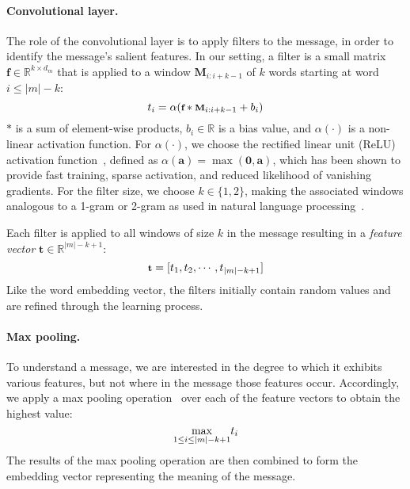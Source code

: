 \documentclass{article}
\begin{document}
\paragraph*{Convolutional layer.} The role of the convolutional layer is to
apply filters to the message, in order to identify the message's salient
features.  In our setting, a filter is a small matrix $\textbf{f} \in
\mathbb{R}^{k \times d_m}$ that is applied to a window
$\textbf{M}_{i:i+k-1}$ of $k$ words starting at word $i \leq |m|-k$:
\begin{equation} \footnotesize
\label{eq:filtering}
t_i = \alpha ( \textbf{f} \ast \textbf{M}_{i:i+k-1} + b_i) 
\end{equation}
$\ast$ is a sum of element-wise products, $b_i \in \mathbb{R}$ is a bias
value, and $\alpha(\cdot)$ is a non-linear activation function.  For
$\alpha(\cdot)$, we choose the rectified linear unit (ReLU) activation
function~\cite{nair2010rectified,dahl2013improving}, defined as
$\alpha(\mathbf{a}) = \max(\mathbf{0}, \mathbf{a})$, which has been shown
to provide fast training, sparse activation, and reduced likelihood of
vanishing gradients.  For the filter size, we choose $k \in \{1,2\}$,
making the associated windows analogous to a 1-gram or 2-gram as used in
natural language processing~\cite{brown1992class}.

Each filter is applied to all windows of size $k$ in the message resulting
in a {\em feature vector} $\textbf{t} \in \mathbb{R}^{|m|-k+1}$:
\begin{equation} \footnotesize
\label{eq:ftr_vector}
\textbf{t} = [t_1, t_2, \cdots, t_{|m|-k+1}]
\end{equation}
Like the word embedding vector, the filters initially contain random values
and are refined through the learning process.

\paragraph*{Max pooling.} To understand a message, we are interested in the
degree to which it exhibits various features, but not where in the message
those features occur.  Accordingly, we apply a max pooling
operation~\cite{collobert2011natural} over each of the feature vectors to
obtain the highest value:
\begin{equation} \footnotesize
\label{eq:pooling}
\underset{1 \leq i \leq |m|-k+1}{\max} t_i
\end{equation}
The results of the max pooling operation are then combined to form the
embedding vector representing the meaning of the message.
\end{document}
